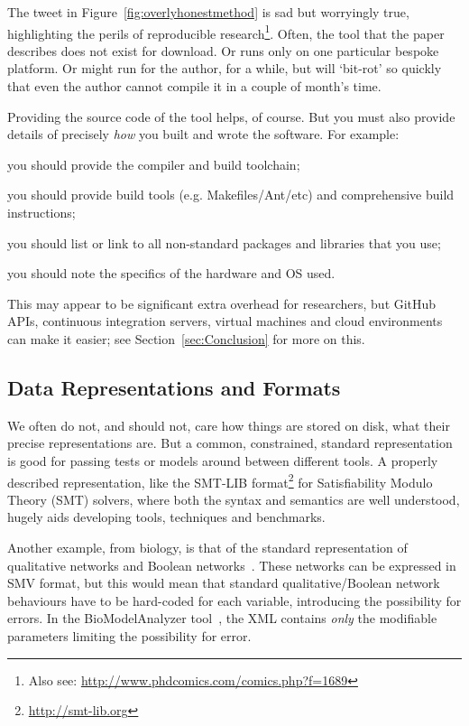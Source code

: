 \documentclass[a4paper,11pt]{article}
\begin{document}
The tweet in Figure~\ref{fig:overlyhonestmethod} is sad but worryingly
true, highlighting the perils of reproducible research\footnote{Also
see: \url{http://www.phdcomics.com/comics.php?f=1689}}. Often, the
tool that the paper describes does not exist for download. Or runs
only on one particular bespoke platform. Or might run for the author,
for a while, but will `bit-rot' so quickly that even the author cannot
compile it in a couple of month's time.

 Providing the
source code of the tool helps, of course. But you must also provide
details of precisely \emph{how} you built and wrote the software. For
example:

\begin{compactitem}
\item you should provide the compiler and build toolchain; 
\item you should provide build tools (e.g. Makefiles/Ant/etc) and
  comprehensive build instructions; 
\item you should list or link to all non-standard packages and libraries that you use; 
\item you should note the specifics of the hardware and OS used. 
\end{compactitem}

This may appear to be significant extra overhead for researchers, but
GitHub APIs, continuous integration servers, virtual machines and
cloud environments can make it easier; see
Section~\ref{sec:Conclusion} for more on this.

\subsection{Data Representations and Formats}

We often do not, and should not, care how things are stored on disk,
what their precise representations are. But a common, constrained,
standard representation is good for passing tests or models around
between different tools. A properly described representation, like the
SMT-LIB format\footnote{\url{http://smt-lib.org}} for Satisfiability
Modulo Theory (SMT) solvers, where both the syntax and semantics are
well understood, hugely aids developing tools, techniques and
benchmarks.

Another example, from biology, is that of the standard representation
of qualitative networks and Boolean
networks~\cite{Kauffman1969,Schaub2007}.  These networks can be
expressed in SMV format, but this would mean that standard
qualitative/Boolean network behaviours have to be hard-coded for each
variable, introducing the possibility for errors. In the
BioModelAnalyzer tool~\cite{Benque2012}, the XML contains \emph{only}
the modifiable parameters limiting the possibility for error.
\end{document}
